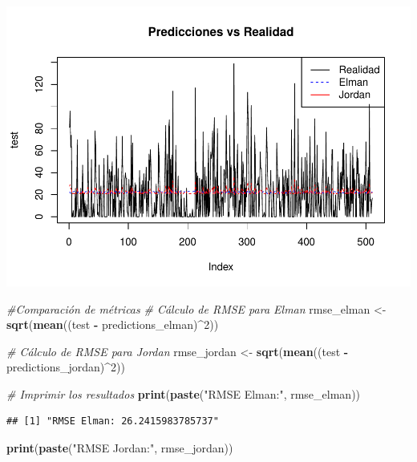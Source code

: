 \documentclass[
]{book}
\newenvironment{Shaded}{\begin{snugshade}}{\end{snugshade}}
\newcommand{\CommentTok}[1]{\textcolor[rgb]{0.56,0.35,0.01}{\textit{#1}}}
\newcommand{\DecValTok}[1]{\textcolor[rgb]{0.00,0.00,0.81}{#1}}
\newcommand{\FunctionTok}[1]{\textcolor[rgb]{0.13,0.29,0.53}{\textbf{#1}}}
\newcommand{\NormalTok}[1]{#1}
\newcommand{\OtherTok}[1]{\textcolor[rgb]{0.56,0.35,0.01}{#1}}
\newcommand{\SpecialCharTok}[1]{\textcolor[rgb]{0.81,0.36,0.00}{\textbf{#1}}}
\newcommand{\StringTok}[1]{\textcolor[rgb]{0.31,0.60,0.02}{#1}}
\begin{document}
\includegraphics{_main_files/figure-latex/unnamed-chunk-40-3.pdf}

\begin{Shaded}
\begin{Highlighting}[]
\CommentTok{\#Comparación de métricas}
\CommentTok{\# Cálculo de RMSE para Elman}
\NormalTok{rmse\_elman }\OtherTok{\textless{}{-}} \FunctionTok{sqrt}\NormalTok{(}\FunctionTok{mean}\NormalTok{((test }\SpecialCharTok{{-}}\NormalTok{ predictions\_elman)}\SpecialCharTok{\^{}}\DecValTok{2}\NormalTok{))}

\CommentTok{\# Cálculo de RMSE para Jordan}
\NormalTok{rmse\_jordan }\OtherTok{\textless{}{-}} \FunctionTok{sqrt}\NormalTok{(}\FunctionTok{mean}\NormalTok{((test }\SpecialCharTok{{-}}\NormalTok{ predictions\_jordan)}\SpecialCharTok{\^{}}\DecValTok{2}\NormalTok{))}

\CommentTok{\# Imprimir los resultados}
\FunctionTok{print}\NormalTok{(}\FunctionTok{paste}\NormalTok{(}\StringTok{"RMSE Elman:"}\NormalTok{, rmse\_elman))}
\end{Highlighting}
\end{Shaded}

\begin{verbatim}
## [1] "RMSE Elman: 26.2415983785737"
\end{verbatim}

\begin{Shaded}
\begin{Highlighting}[]
\FunctionTok{print}\NormalTok{(}\FunctionTok{paste}\NormalTok{(}\StringTok{"RMSE Jordan:"}\NormalTok{, rmse\_jordan))}
\end{Highlighting}
\end{Shaded}
\end{document}

